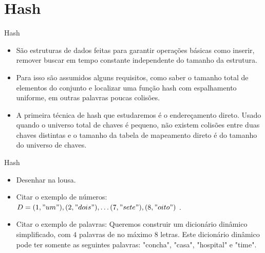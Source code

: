 \section{Hash}

\begin{frame}
	\begin{block}{Hash}
		\begin{itemize}
			\item São estruturas de dados feitas para garantir operações básicas como inserir, remover buscar em tempo constante independente do tamanho da estrutura.

			\item Para isso são assumidos alguns requisitos, como saber o tamanho total de elementos do conjunto e localizar uma função hash com espalhamento uniforme, em outras palavras poucas colisões.
			
			\item A primeira técnica de hash que estudaremos é o endereçamento direto. Usado quando o universo total de chaves é pequeno, não existem colisões entre duas chaves distintas e o tamanho da tabela de mapeamento direto é do tamanho do universo de chaves.

		\end{itemize}
	\end{block}
\end{frame}

\begin{frame}
	\begin{block}{Hash}
		\begin{itemize}
			\item Desenhar na lousa.

			\item Citar o exemplo de números: $D = {(1, "um"), (2, "dois"), \ldots (7, "sete"), (8, "oito") }$ .
				
			\item Citar o exemplo de palavras: Queremos construir um dicionário dinâmico simplificado, com $4$ palavras de no máximo $8$ letras. Este dicionário dinâmico pode ter somente as seguintes palavras: "concha", "casa", "hospital" e "time".

		\end{itemize}
	\end{block}
\end{frame}

